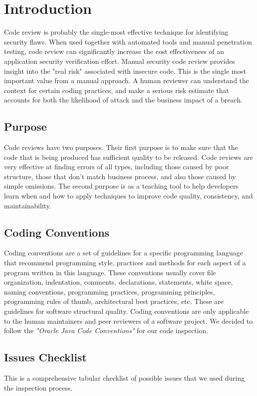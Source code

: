 \chapter{Introduction} \label{chap1}
Code review is probably the single-most effective technique for identifying security flaws. When used together with automated tools and manual penetration testing, code review can significantly increase the cost effectiveness of an application security verification effort.
Manual security code review provides insight into the "real risk" associated with insecure code. This is the single most important value from a manual approach. A human reviewer can understand the context for certain coding practices, and make a serious risk estimate that accounts for both the likelihood of attack and the business impact of a breach.

\section{Purpose}
Code reviews have two purposes. Their first purpose is to make sure that the code that is being produced has sufficient quality to be released. Code reviews are very effective at finding errors of all types, including those caused by poor structure, those that don't match business process, and also those caused by simple omissions.
The second purpose is as a teaching tool to help developers learn when and how to apply techniques to improve code quality, consistency, and maintainability. 

\section{Coding Conventions}
Coding conventions are a set of guidelines for a specific programming language that recommend programming style, practices and methods for each aspect of a program written in this language. These conventions usually cover file organization, indentation, comments, declarations, statements, white space, naming conventions, programming practices, programming principles, programming rules of thumb, architectural best practices, etc. These are guidelines for software structural quality. Coding conventions are only applicable to the human maintainers and peer reviewers of a software project.
We decided to follow the \textit{"Oracle Java Code Conventions"} for our code inspection.

\section{Issues Checklist}
This is a comprehensive tabular checklist of possible issues that we used during the inspection process.

